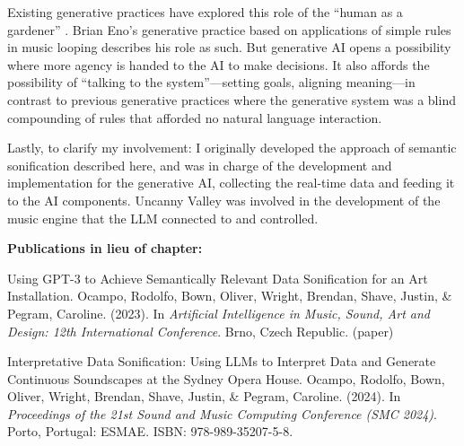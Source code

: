Existing generative practices have explored this role of the “human as a gardener” \cite{Eno2020-ip}. Brian Eno’s generative practice based on applications of simple rules in music looping describes his role as such. But generative AI opens a possibility where more agency is handed to the AI to make decisions. It also affords the possibility of “talking to the system”—setting goals, aligning meaning—in contrast to previous generative practices where the generative system was a blind compounding of rules that afforded no natural language interaction.

Lastly, to clarify my involvement: I originally developed the approach of semantic sonification described here, and was in charge of the development and implementation for the generative AI, collecting the real-time data and feeding it to the AI components. Uncanny Valley was involved in the development of the music engine that the LLM connected to and controlled.

\textbf{Publications in lieu of chapter:}

Using GPT-3 to Achieve Semantically Relevant Data Sonification for an Art Installation. Ocampo, Rodolfo, Bown, Oliver, Wright, Brendan, Shave, Justin, \& Pegram, Caroline. (2023). In \textit{Artificial Intelligence in Music, Sound, Art and Design: 12th International Conference}. Brno, Czech Republic. (paper)

Interpretative Data Sonification: Using LLMs to Interpret Data and Generate Continuous Soundscapes at the Sydney Opera House. Ocampo, Rodolfo, Bown, Oliver, Wright, Brendan, Shave, Justin, \& Pegram, Caroline. (2024). In \textit{Proceedings of the 21st Sound and Music Computing Conference (SMC 2024)}. Porto, Portugal: ESMAE. ISBN: 978-989-35207-5-8.







